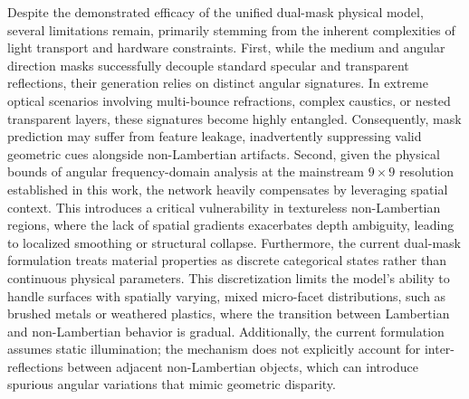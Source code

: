 \documentclass[lettersize,journal]{IEEEtran}
\begin{document}
Despite the demonstrated efficacy of the unified dual-mask physical model, several limitations remain, primarily stemming from the inherent complexities of light transport and hardware constraints. First, while the medium and angular direction masks successfully decouple standard specular and transparent reflections, their generation relies on distinct angular signatures. In extreme optical scenarios involving multi-bounce refractions, complex caustics, or nested transparent layers, these signatures become highly entangled. Consequently, mask prediction may suffer from feature leakage, inadvertently suppressing valid geometric cues alongside non-Lambertian artifacts. Second, given the physical bounds of angular frequency-domain analysis at the mainstream $9 \times 9$ resolution established in this work, the network heavily compensates by leveraging spatial context. This introduces a critical vulnerability in textureless non-Lambertian regions, where the lack of spatial gradients exacerbates depth ambiguity, leading to localized smoothing or structural collapse. Furthermore, the current dual-mask formulation treats material properties as discrete categorical states rather than continuous physical parameters. This discretization limits the model's ability to handle surfaces with spatially varying, mixed micro-facet distributions, such as brushed metals or weathered plastics, where the transition between Lambertian and non-Lambertian behavior is gradual. Additionally, the current formulation assumes static illumination; the mechanism does not explicitly account for inter-reflections between adjacent non-Lambertian objects, which can introduce spurious angular variations that mimic geometric disparity.
\end{document}
